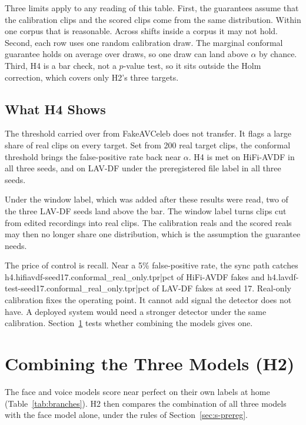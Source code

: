 Three limits apply to any reading of this table. First, the guarantees assume that
the calibration clips and the scored clips come from the same distribution.
Within one corpus that is reasonable. Across shifts inside a corpus it may not
hold. Second, each row uses one random calibration draw. The marginal
conformal guarantee holds on average over draws, so one draw can land above
$\alpha$ by chance. Third, H4 is a bar check, not a $p$-value test, so it sits
outside the Holm correction, which covers only H2's three targets.

\subsection{What H4 Shows}

The threshold carried over from FakeAVCeleb does not transfer. It flags a large
share of real clips on every target. Set from 200 real target clips, the
conformal threshold brings the false-positive rate back near $\alpha$. H4 is
met on HiFi-AVDF in all three seeds, and on LAV-DF under the preregistered
file label in all three seeds.

Under the window label, which was added after these results were read, two of the three LAV-DF seeds land above the bar. The window label turns
clips cut from edited recordings into real clips. The calibration reals and
the scored reals may then no longer share one distribution, which is the
assumption the guarantee needs.

The price of control is recall. Near a 5\% false-positive rate, the sync path
catches {{h4.hifiavdf-seed17.conformal_real_only.tpr|pct}} of HiFi-AVDF fakes
and {{h4.lavdf-test-seed17.conformal_real_only.tpr|pct}} of LAV-DF fakes at
seed 17. Real-only calibration fixes the operating point. It cannot add signal
the detector does not have. A deployed system would need a stronger detector
under the same calibration. Section~\ref{sec:r-combine} tests whether combining the models gives one.

\section{Combining the Three Models (H2)}
\label{sec:r-combine}

The face and voice models score near perfect on their own labels at home
(Table~\ref{tab:branches}). H2 then compares the combination of all three
models with the face model alone, under the rules of
Section~\ref{sec:s-prereg}.

